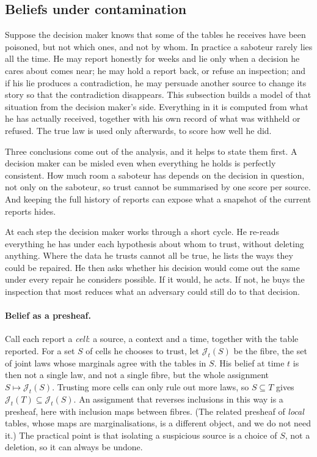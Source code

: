 \documentclass[11pt]{article}
\theoremstyle{definition}\newtheorem{definition}[theorem]{Definition}\newtheorem{remark}[theorem]{Remark}\newtheorem{example}[theorem]{Example}\newtheorem{problem}[theorem]{Open problem}\crefname{problem}{Problem}{Problems}
\begin{document}
\subsection{Beliefs under contamination}\label{sec:contam}
Suppose the decision maker knows that some of the tables he receives have been poisoned, but not which ones, and not by whom. In practice a saboteur rarely lies all the time. He may report honestly for weeks and lie only when a decision he cares about comes near; he may hold a report back, or refuse an inspection; and if his lie produces a contradiction, he may persuade another source to change its story so that the contradiction disappears. This subsection builds a model of that situation from the decision maker's side. Everything in it is computed from what he has actually received, together with his own record of what was withheld or refused. The true law is used only afterwards, to score how well he did.

Three conclusions come out of the analysis, and it helps to state them first. A decision maker can be misled even when everything he holds is perfectly consistent. How much room a saboteur has depends on the decision in question, not only on the saboteur, so trust cannot be summarised by one score per source. And keeping the full history of reports can expose what a snapshot of the current reports hides.

At each step the decision maker works through a short cycle. He re-reads everything he has under each hypothesis about whom to trust, without deleting anything. Where the data he trusts cannot all be true, he lists the ways they could be repaired. He then asks whether his decision would come out the same under every repair he considers possible. If it would, he acts. If not, he buys the inspection that most reduces what an adversary could still do to that decision.

\paragraph{Belief as a presheaf.} Call each report a \emph{cell}: a source, a context and a time, together with the table reported. For a set $S$ of cells he chooses to trust, let $\mathcal J_t(S)$ be the fibre, the set of joint laws whose marginals agree with the tables in $S$. His belief at time $t$ is then not a single law, and not a single fibre, but the whole assignment $S\mapsto\mathcal J_t(S)$. Trusting more cells can only rule out more laws, so $S\subseteq T$ gives $\mathcal J_t(T)\subseteq\mathcal J_t(S)$. An assignment that reverses inclusions in this way is a presheaf, here with inclusion maps between fibres. (The related presheaf of \emph{local} tables, whose maps are marginalisations, is a different object, and we do not need it.) The practical point is that isolating a suspicious source is a choice of $S$, not a deletion, so it can always be undone.
\end{document}

